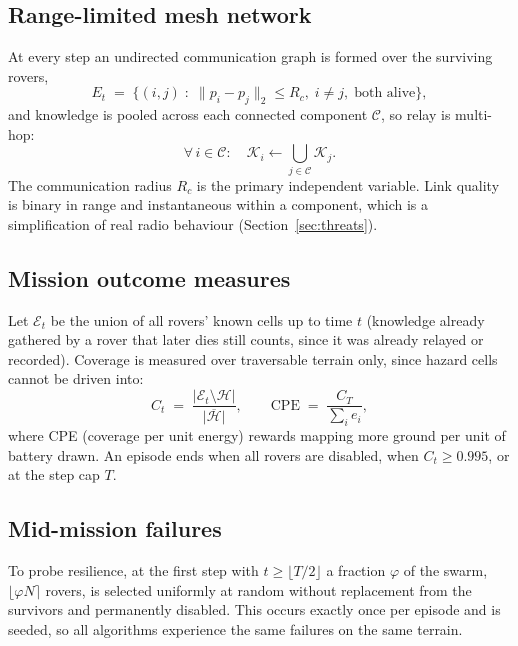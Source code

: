 \documentclass[11pt]{article}
\begin{document}
\subsection{Range-limited mesh network}

At every step an undirected communication graph is formed over the surviving
rovers,
\begin{equation}
E_t \;=\; \big\{ (i,j) \;:\; \lVert p_i - p_j \rVert_2 \le R_c,\; i \ne j,\; \text{both alive} \big\},
\end{equation}
and knowledge is pooled across each connected component $\mathcal{C}$, so relay
is multi-hop:
\begin{equation}
\forall\, i \in \mathcal{C}: \quad \mathcal{K}_i \leftarrow \bigcup_{j \in \mathcal{C}} \mathcal{K}_j .
\label{eq:mesh}
\end{equation}
The communication radius $R_c$ is the primary independent variable. Link
quality is binary in range and instantaneous within a component, which is a
simplification of real radio behaviour (Section~\ref{sec:threats}).

\subsection{Mission outcome measures}

Let $\mathcal{E}_t$ be the union of all rovers' known cells up to time $t$
(knowledge already gathered by a rover that later dies still counts, since it
was already relayed or recorded). Coverage is measured over traversable
terrain only, since hazard cells cannot be driven into:
\begin{equation}
C_t \;=\; \frac{\lvert \mathcal{E}_t \setminus \mathcal{H} \rvert}{\lvert \overline{\mathcal{H}} \rvert},
\qquad
\text{CPE} \;=\; \frac{C_T}{\sum_i e_i},
\label{eq:coverage}
\end{equation}
where CPE (coverage per unit energy) rewards mapping more ground per unit of
battery drawn. An episode ends when all rovers are disabled, when
$C_t \ge 0.995$, or at the step cap $T$.

\subsection{Mid-mission failures}

To probe resilience, at the first step with $t \ge \lfloor T/2 \rfloor$ a
fraction $\varphi$ of the swarm, $\lfloor \varphi N \rceil$ rovers, is selected
uniformly at random without replacement from the survivors and permanently
disabled. This occurs exactly once per episode and is seeded, so all algorithms
experience the same failures on the same terrain.
\end{document}
